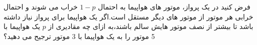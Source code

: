 
فرض کنید در یک پرواز، موتور های هواپیما به احتمال $1 - p$ خراب می شوند و احتمال خرابی هر موتور از موتور های دیگر مستقل است.اگر یک هواپیما برای پرواز نیاز داشته باشد تا بیشتر از نصف موتور هایش سالم باشند،به ازای چه مقادیری از $p$ یک هواپیما با 5 موتور را به یک هواپیما با 3 موتور ترجیح می دهید؟
